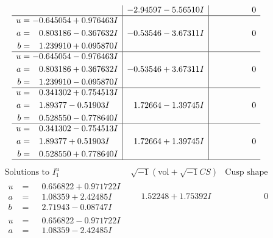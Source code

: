 \documentclass[1p]{elsarticle_modified}
\theoremstyle{definition}
\newcommand{\I}{\sqrt{-1}}
\begin{document}
$$\begin{array}{c|c|c}
 & -2.94597 - 5.56510 I & \phantom{-0.000000 } 0 \\ \hline\begin{aligned}
u &= -0.645054 + 0.976463 I \\
a &= \phantom{-}0.803186 - 0.367632 I \\
b &= \phantom{-}1.239910 + 0.095870 I\end{aligned}
 & -0.53546 - 3.67311 I & \phantom{-0.000000 } 0 \\ \hline\begin{aligned}
u &= -0.645054 - 0.976463 I \\
a &= \phantom{-}0.803186 + 0.367632 I \\
b &= \phantom{-}1.239910 - 0.095870 I\end{aligned}
 & -0.53546 + 3.67311 I & \phantom{-0.000000 } 0 \\ \hline\begin{aligned}
u &= \phantom{-}0.341302 + 0.754513 I \\
a &= \phantom{-}1.89377 - 0.51903 I \\
b &= \phantom{-}0.528550 - 0.778640 I\end{aligned}
 & \phantom{-}1.72664 - 1.39745 I & \phantom{-0.000000 } 0 \\ \hline\begin{aligned}
u &= \phantom{-}0.341302 - 0.754513 I \\
a &= \phantom{-}1.89377 + 0.51903 I \\
b &= \phantom{-}0.528550 + 0.778640 I\end{aligned}
 & \phantom{-}1.72664 + 1.39745 I & \phantom{-0.000000 } 0\\
 \hline 
 \end{array}$$\newpage$$\begin{array}{c|c|c}  
\text{Solutions to }I^u_{1}& \I (\text{vol} + \sqrt{-1}CS) & \text{Cusp shape}\\
 \hline 
\begin{aligned}
u &= \phantom{-}0.656822 + 0.971722 I \\
a &= \phantom{-}1.08359 + 2.42485 I \\
b &= \phantom{-}2.71943 - 0.08747 I\end{aligned}
 & \phantom{-}1.52248 + 1.75392 I & \phantom{-0.000000 } 0 \\ \hline\begin{aligned}
u &= \phantom{-}0.656822 - 0.971722 I \\
a &= \phantom{-}1.08359 - 2.42485 I \\

\end{aligned}
\end{array}$$
\end{document}
